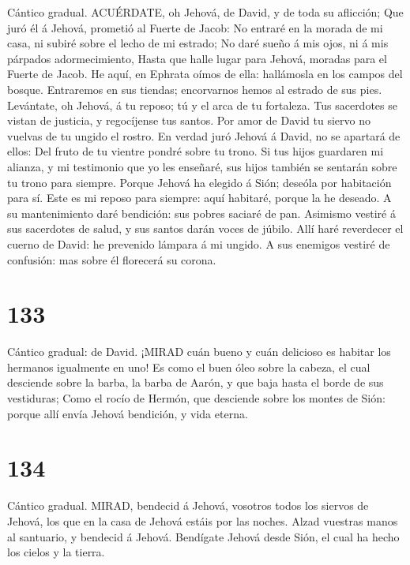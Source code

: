  Cántico gradual. ACUÉRDATE, oh Jehová, de David, y de toda
su aflicción;  Que juró él á Jehová, prometió al Fuerte de
Jacob:  No entraré en la morada de mi casa, ni subiré sobre
el lecho de mi estrado;  No daré sueño á mis ojos, ni á mis
párpados adormecimiento,  Hasta que halle lugar para Jehová,
moradas para el Fuerte de Jacob.  He aquí, en Ephrata oímos
de ella: hallámosla en los campos del bosque.  Entraremos en
sus tiendas; encorvarnos hemos al estrado de sus pies. 
Levántate, oh Jehová, á tu reposo; tú y el arca de tu fortaleza.
 Tus sacerdotes se vistan de justicia, y regocíjense tus
santos.  Por amor de David tu siervo no vuelvas de tu
ungido el rostro.  En verdad juró Jehová á David, no se
apartará de ellos: Del fruto de tu vientre pondré sobre tu trono.
 Si tus hijos guardaren mi alianza, y mi testimonio que yo
les enseñaré, sus hijos también se sentarán sobre tu trono para siempre.
 Porque Jehová ha elegido á Sión; deseóla por habitación
para sí.  Este es mi reposo para siempre: aquí habitaré,
porque la he deseado.  A su mantenimiento daré bendición:
sus pobres saciaré de pan.  Asimismo vestiré á sus
sacerdotes de salud, y sus santos darán voces de júbilo. 
Allí haré reverdecer el cuerno de David: he prevenido lámpara á mi
ungido.  A sus enemigos vestiré de confusión: mas sobre él
florecerá su corona.

\hypertarget{section-132}{%
\section{133}\label{section-132}}

 Cántico gradual: de David. ¡MIRAD cuán bueno y cuán
delicioso es habitar los hermanos igualmente en uno!  Es
como el buen óleo sobre la cabeza, el cual desciende sobre la barba, la
barba de Aarón, y que baja hasta el borde de sus vestiduras;
 Como el rocío de Hermón, que desciende sobre los montes de
Sión: porque allí envía Jehová bendición, y vida eterna.

\hypertarget{section-133}{%
\section{134}\label{section-133}}

 Cántico gradual. MIRAD, bendecid á Jehová, vosotros todos
los siervos de Jehová, los que en la casa de Jehová estáis por las
noches.  Alzad vuestras manos al santuario, y bendecid á
Jehová.  Bendígate Jehová desde Sión, el cual ha hecho los
cielos y la tierra.

